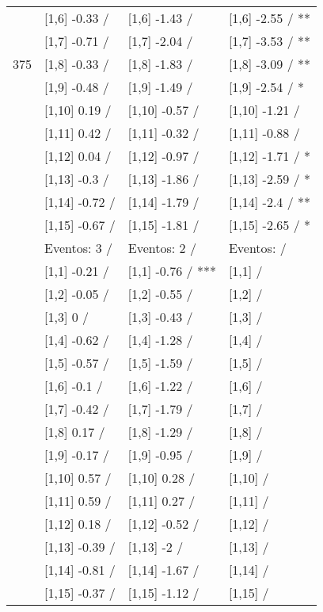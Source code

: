 \begin{table}
\begin{tabular}[t]{llll}
 & {}[1,6] -0.33  / & {}[1,6] -1.43  / & {}[1,6] -2.55  / **\\
 & {}[1,7] -0.71  / & {}[1,7] -2.04  / & {}[1,7] -3.53  / **\\
375 & {}[1,8] -0.33  / & {}[1,8] -1.83  / & {}[1,8] -3.09  / **\\
\addlinespace
 & {}[1,9] -0.48  / & {}[1,9] -1.49  / & {}[1,9] -2.54  / *\\
 & {}[1,10] 0.19  / & {}[1,10] -0.57  / & {}[1,10] -1.21  /\\
 & {}[1,11] 0.42  / & {}[1,11] -0.32  / & {}[1,11] -0.88  /\\
 & {}[1,12] 0.04  / & {}[1,12] -0.97  / & {}[1,12] -1.71  / *\\
 & {}[1,13] -0.3  / & {}[1,13] -1.86  / & {}[1,13] -2.59  / *\\
\addlinespace
 & {}[1,14] -0.72  / & {}[1,14] -1.79  / & {}[1,14] -2.4  / **\\
 & {}[1,15] -0.67  / & {}[1,15] -1.81  / & {}[1,15] -2.65  / *\\
 & Eventos:  3 / & Eventos:  2 / & Eventos:   /\\
 & {}[1,1] -0.21  / & {}[1,1] -0.76  / *** & {}[1,1]  /\\
 & {}[1,2] -0.05  / & {}[1,2] -0.55  / & {}[1,2]  /\\
\addlinespace
 & {}[1,3] 0  / & {}[1,3] -0.43  / & {}[1,3]  /\\
 & {}[1,4] -0.62  / & {}[1,4] -1.28  / & {}[1,4]  /\\
 & {}[1,5] -0.57  / & {}[1,5] -1.59  / & {}[1,5]  /\\
 & {}[1,6] -0.1  / & {}[1,6] -1.22  / & {}[1,6]  /\\
 & {}[1,7] -0.42  / & {}[1,7] -1.79  / & {}[1,7]  /\\
\addlinespace
500 & {}[1,8] 0.17  / & {}[1,8] -1.29  / & {}[1,8]  /\\
 & {}[1,9] -0.17  / & {}[1,9] -0.95  / & {}[1,9]  /\\
 & {}[1,10] 0.57  / & {}[1,10] 0.28  / & {}[1,10]  /\\
 & {}[1,11] 0.59  / & {}[1,11] 0.27  / & {}[1,11]  /\\
 & {}[1,12] 0.18  / & {}[1,12] -0.52  / & {}[1,12]  /\\
\addlinespace
 & {}[1,13] -0.39  / & {}[1,13] -2  / & {}[1,13]  /\\
 & {}[1,14] -0.81  / & {}[1,14] -1.67  / & {}[1,14]  /\\
 & {}[1,15] -0.37  / & {}[1,15] -1.12  / & {}[1,15]  /\\
\bottomrule
\end{tabular}
\end{table}

